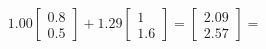 \documentclass[preview]{standalone}
\begin{document}
\begin{align*}
1.00 \begin{bmatrix} 0.8 \\ 0.5 \end{bmatrix} + 1.29 \begin{bmatrix} 1 \\ 1.6 \end{bmatrix} = \begin{bmatrix} 2.09 \\ 2.57 \end{bmatrix} =
\end{align*}
\end{document}
